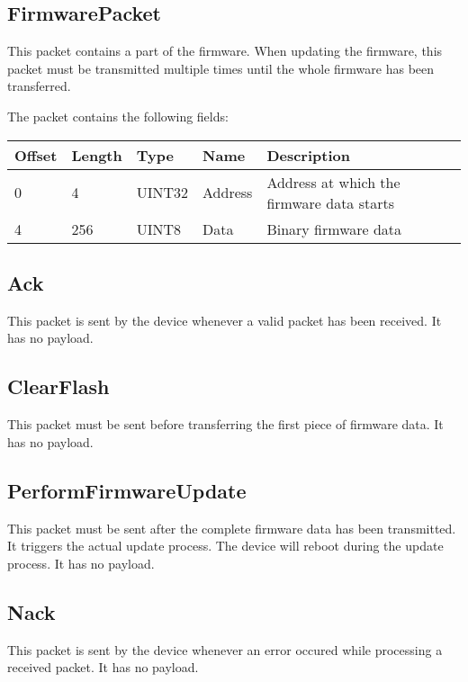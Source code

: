 \documentclass[a4paper,11pt]{article}
\begin{document}
\subsection{FirmwarePacket}
This packet contains a part of the firmware. When updating the firmware, this packet must be transmitted multiple times until the whole firmware has been transferred.

The packet contains the following fields:
\begin{ThreePartTable}
\setlength\tabcolsep{3pt}

\begin{longtable}{p{} |  p{}  |  p{}| p{} | p{}}
\toprule
\textbf{Offset} &\textbf{Length} &\textbf{Type} & \textbf{Name} &\textbf{Description} \\ 
\hline
\endhead
\midrule[\heavyrulewidth]
\endfoot  
\midrule[\heavyrulewidth]
\endlastfoot

0 & 4 & UINT32 & Address & Address at which the firmware data starts\\
4 & 256 & UINT8 & Data & Binary firmware data \\
\end{longtable}   
\end{ThreePartTable}

\subsection{Ack}
This packet is sent by the device whenever a valid packet has been received. It has no payload.

\subsection{ClearFlash}
This packet must be sent before transferring the first piece of firmware data. It has no payload.

\subsection{PerformFirmwareUpdate}
This packet must be sent after the complete firmware data has been transmitted. It triggers the actual update process. The device will reboot during the update process. It has no payload.

\subsection{Nack}
This packet is sent by the device whenever an error occured while processing a received packet. It has no payload.
\end{document}
